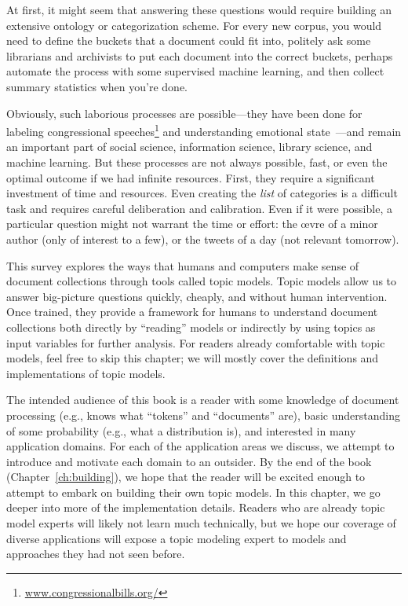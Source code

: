 At first, it might seem that answering these questions would require building an
extensive ontology or categorization scheme.  For every new corpus, you would need to define  the buckets that a document could fit into, politely ask some librarians and
archivists to put each document into the correct buckets, perhaps automate the
process with some supervised machine learning, and then collect summary
statistics when you're done.

Obviously, such laborious processes are possible---they have been done
for labeling congressional
speeches\footnote{\url{www.congressionalbills.org/}} and understanding
emotional state~\cite{wiebestates}---and remain an important part of
social science, information science, library science, and machine
learning.  But these processes are not always possible, fast, or even
the optimal outcome if we had infinite resources.  First, they
 require a significant investment of time and resources.
Even creating the \emph{list} of categories is a difficult task and
requires careful deliberation and calibration.  Even if it were possible, a
particular question might not warrant the time or effort: the \oe{}vre
of a minor author (only of interest to a few), or the tweets of a day
(not relevant tomorrow).

This survey explores the ways that humans and
computers make sense of document collections through tools called topic models.
Topic models allow us to answer big-picture questions quickly, cheaply, and without human intervention.
Once trained, they provide a framework for humans to understand document collections both directly by ``reading'' models or indirectly by using topics as input variables for further analysis.
For readers already comfortable with topic models, feel free to skip this
chapter; we will mostly cover the definitions and implementations of topic models.

The intended audience of this book is a reader with some knowledge of
document processing (e.g., knows what ``tokens'' and ``documents''
are), basic understanding of some probability (e.g., what a
distribution is), and interested in many application domains.  For
each of the application areas we discuss, we attempt to introduce and
motivate each domain to an outsider.  By the
end of the book (Chapter~\ref{ch:building}), we hope that the reader
will be excited enough to attempt to embark on building their own
topic models.  In this chapter, we go deeper into more of the
implementation details.  Readers who are already topic model experts
will likely not learn much technically, but we hope our coverage of
diverse applications will expose a topic modeling expert to models and
approaches they had not seen before.

